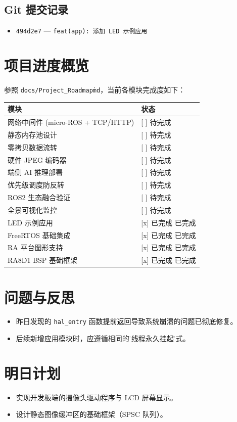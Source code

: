 \documentclass[cn, chinesefont=nofont, color=black, device=normal, 11pt]{elegantnote}
\begin{document}
\subsection{Git 提交记录}
\begin{itemize}
    \item \texttt{494d2e7} — \texttt{feat(app): 添加 LED 示例应用}
\end{itemize}

\section{项目进度概览}
参照 \texttt{docs/Project\_Roadmap\.md}，当前各模块完成度如下：

\begin{table}[htbp]
    \centering
    \begin{tabular}{lp{6cm}}
        \toprule
        \textbf{模块}                  & \textbf{状态} \\
        \midrule
        网络中间件 (micro-ROS + TCP/HTTP) & [ ] 待完成     \\
        静态内存池设计                      & [ ] 待完成     \\
        零拷贝数据流转                      & [ ] 待完成     \\
        硬件 JPEG 编码器                  & [ ] 待完成     \\
        端侧 AI 推理部署                   & [ ] 待完成     \\
        优先级调度防反转                     & [ ] 待完成     \\
        ROS2 生态融合验证                  & [ ] 待完成     \\
        全景可视化监控                      & [ ] 待完成     \\
        \midrule
        LED 示例应用                     & [x] 已完成 已完成 \\
        FreeRTOS 基础集成                & [x] 已完成 已完成 \\
        RA 平台图形支持                    & [x] 已完成 已完成 \\
        RA8D1 BSP 基础框架               & [x] 已完成 已完成 \\
        \bottomrule
    \end{tabular}
\end{table}

\section{问题与反思}
\begin{itemize}
    \item 昨日发现的 \texttt{hal\_entry} 函数提前返回导致系统崩溃的问题已彻底修复。
    \item 后续新增应用模块时，应遵循相同的\"主线程永久挂起\"模式。
\end{itemize}

\section{明日计划}
\begin{itemize}
    \item 实现开发板端的摄像头驱动程序与 LCD 屏幕显示。
    \item 设计静态图像缓冲区的基础框架（SPSC 队列）。
\end{itemize}
\end{document}

